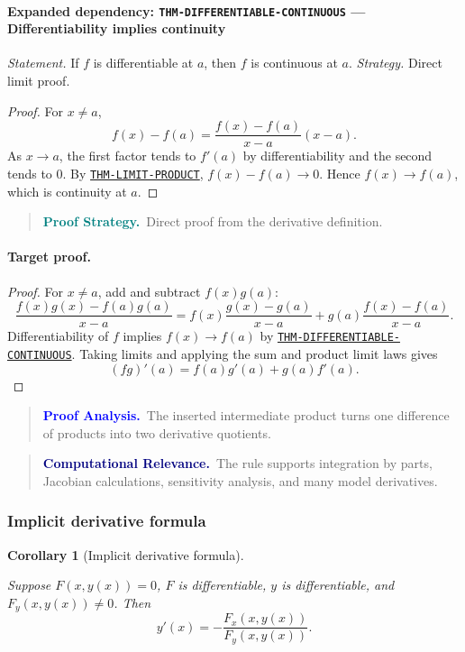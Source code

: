 \documentclass[10pt]{article}
\newcommand{\pidraw}[1]{\begingroup\urlstyle{tt}\nolinkurl{#1}\endgroup}
\newcommand{\pidref}[1]{\hyperref[prf:#1]{\pidraw{#1}}}
\newcommand{\pid}[1]{\pidref{#1}}
\newtheorem{corollary}[theorem]{Corollary}
\theoremstyle{definition}
\theoremstyle{remark}
\newenvironment{proofstrategy}
{\begin{quote}\small\noindent\textbf{\textcolor{teal}{Proof Strategy.}}\ }
{\end{quote}}
\newenvironment{proofanalysis}
{\begin{quote}\small\noindent\textbf{\textcolor{blue}{Proof Analysis.}}\ }
{\end{quote}}
\newenvironment{computationalrelevance}
{\begin{quote}\small\noindent\textbf{\textcolor{navy}{Computational Relevance.}}\ }
{\end{quote}}
\begin{document}
\paragraph{Expanded dependency: \pidraw{THM-DIFFERENTIABLE-CONTINUOUS} --- Differentiability implies continuity}
\textit{Statement.} If $f$ is differentiable at $a$, then $f$ is continuous at $a$.
\textit{Strategy.} Direct limit proof.
\begin{proof}For $x\ne a$,
\[
f(x)-f(a)=
\frac{f(x)-f(a)}{x-a}(x-a).
\]
As $x\to a$, the first factor tends to $f'(a)$ by differentiability and the
second tends to $0$. By \pid{THM-LIMIT-PRODUCT},
$f(x)-f(a)\to0$. Hence $f(x)\to f(a)$, which is continuity at $a$.\end{proof}

\begin{proofstrategy}Direct proof from the derivative definition.\end{proofstrategy}

\paragraph{Target proof.}

\begin{proof}

For $x\ne a$, add and subtract $f(x)g(a)$:
\[
\frac{f(x)g(x)-f(a)g(a)}{x-a}
=
f(x)\frac{g(x)-g(a)}{x-a}
+
g(a)\frac{f(x)-f(a)}{x-a}.
\]
Differentiability of $f$ implies $f(x)\to f(a)$ by
\pid{THM-DIFFERENTIABLE-CONTINUOUS}. Taking limits and applying the sum and
product limit laws gives
\[
(fg)'(a)=f(a)g'(a)+g(a)f'(a).
\]

\end{proof}

\begin{proofanalysis}The inserted intermediate product turns one difference of products into two derivative quotients.\end{proofanalysis}

\begin{computationalrelevance}The rule supports integration by parts, Jacobian calculations, sensitivity analysis, and many model derivatives.\end{computationalrelevance}

\subsubsection{Implicit derivative formula}

\begin{corollary}[Implicit derivative formula]\label{prf:COR-IMPLICIT-DERIVATIVE}

Suppose $F(x,y(x))=0$, $F$ is differentiable, $y$ is differentiable, and
$F_y(x,y(x))\ne0$. Then
\[
y'(x)=-\frac{F_x(x,y(x))}{F_y(x,y(x))}.
\]

\end{corollary}
\end{document}

